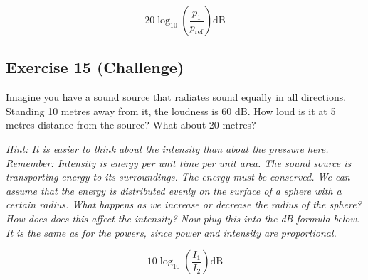 \documentclass[a4paper, 11pt]{article}
\begin{document}
\begin{equation}\label{eq:dB}
    20 \log_{10}(\frac{p_1}{p_{\text{ref}}}) \text{dB}
\end{equation}
\vspace{4cm}

\subsection*{Exercise 15 (Challenge)}
Imagine you have a sound source that radiates sound equally in all directions. Standing 10 metres away from it, the loudness is 60 dB. How loud is it at 5 metres distance from the source? What about 20 metres?

\textit{Hint: It is easier to think about the intensity than about the pressure here. Remember: Intensity is energy per unit time per unit area. The sound source is transporting energy to its surroundings. The energy must be conserved. We can assume that the energy is distributed evenly on the surface of a sphere with a certain radius. What happens as we increase or decrease the radius of the sphere? How does does this affect the intensity? Now plug this into the dB formula below. It is the same as for the powers, since power and intensity are proportional.}

\begin{equation}
    10 \log_{10}(\frac{I_1}{I_2}) \text{dB}
\end{equation}
\end{document}
